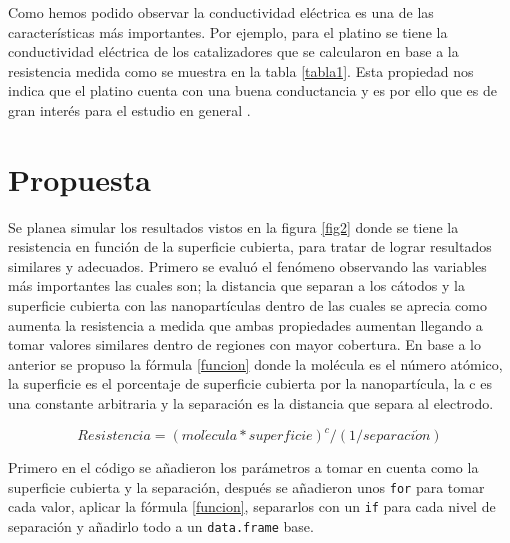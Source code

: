 \documentclass{elsarticle}
\begin{document}
Como hemos podido observar la conductividad eléctrica es una de las características más importantes. Por ejemplo, para el platino se tiene la conductividad eléctrica de los catalizadores que se calcularon en base a la resistencia medida como se muestra en la tabla \ref{tabla1}. Esta propiedad nos indica que el platino cuenta con una buena conductancia y es por ello que es de gran interés para el estudio en general \cite{Bogdanovskayatab}.

\section{Propuesta}
Se planea simular los resultados vistos en la figura \ref{fig2} donde se tiene la resistencia en función de la superficie cubierta, para tratar de lograr resultados similares y adecuados. Primero se evaluó el fenómeno observando las variables más importantes las cuales son; la distancia que separan a los cátodos y la superficie cubierta con las nanopartículas dentro de las cuales se aprecia como aumenta la resistencia a medida que ambas propiedades aumentan llegando a tomar valores similares dentro de regiones con mayor cobertura. En base a lo anterior se propuso la fórmula \ref{funcion} donde la molécula es el número atómico, la superficie es el porcentaje de superficie cubierta por la nanopartícula, la c es una constante arbitraria y la separación es la distancia que separa al electrodo.

\begin{equation}
Resistencia=(mol\acute{e}cula*superficie)^c/(1/separaci\acute{o}n)
\label{funcion}
\end{equation}

Primero en el código se añadieron los parámetros a tomar en cuenta como la superficie cubierta y la separación, después se añadieron unos \texttt{for} para tomar cada valor, aplicar la fórmula \ref{funcion}, separarlos con un \texttt{if} para cada nivel de separación y añadirlo todo a un \texttt{data.frame} base.
\end{document}
